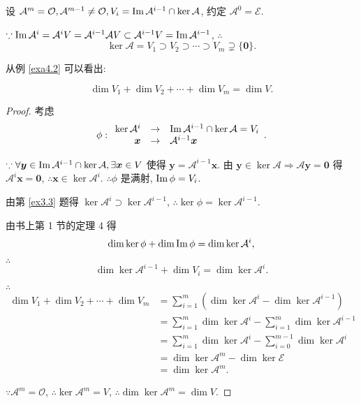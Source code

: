 \documentclass{ctexart}
\begin{document}
设 $\mathcal{A}^m=\mathcal{O},\mathcal{A}^{m-1}\neq\mathcal{O},V_i=\operatorname{Im} \mathcal{A}^{i-1}\cap\ker\mathcal{A}$, 约定 $\mathcal{A}^0=\mathcal{E}$.

$\because\operatorname{Im} \mathcal{A}^i=\mathcal{A}^iV=\mathcal{A}^{i-1}\mathcal{A}V\subset\mathcal{A}^{i-1}V=\operatorname{Im} \mathcal{A}^{i-1}$, $\therefore$
\[\ker\mathcal{A}=V_1\supset V_2\supset\cdots\supset V_m\supsetneq\{\boldsymbol{0}\}.\]

从例 \ref{exa4.2} 可以看出:
\begin{lemma}\label{l4.1}
    \[\dim V_1+\dim V_2+\cdots+\dim V_m=\dim V.\]
\end{lemma}
\begin{proof}
    考虑
    \[\phi:\begin{array}{rcl}
        \ker\mathcal{A}^i & \to & \operatorname{Im} \mathcal{A}^{i-1}\cap\ker\mathcal{A}=V_i \\
        \boldsymbol{x} & \to & \mathcal{A}^{i-1}\boldsymbol{x} \\
    \end{array}.\]

    $\because\forall\boldsymbol{y}\in\operatorname{Im} \mathcal{A}^{i-1}\cap\ker\mathcal{A},\exists\boldsymbol{x}\in V$ 使得 $\boldsymbol{y}=\mathcal{A}^{i-1}\boldsymbol{x}$. 由 $\boldsymbol{y}\in\ker\mathcal{A}\Rightarrow\mathcal{A}\boldsymbol{y}=\boldsymbol{0}$ 得 $\mathcal{A}^i\boldsymbol{x}=\boldsymbol{0}$, $\therefore\boldsymbol{x}\in\ker\mathcal{A}^i$. $\therefore\phi$ 是满射, $\operatorname{Im} \phi=V_i$.

    由第 \ref{ex3.3} 题得 $\ker\mathcal{A}^i\supset\ker\mathcal{A}^{i-1}$, $\therefore\ker\phi=\ker\mathcal{A}^{i-1}$.

    由书上第 1 节的定理 4 得
    \[\dim\ker\phi+\dim\operatorname{Im} \phi=\dim\ker\mathcal{A}^i,\]

    $\therefore$
    \begin{equation}\label{eq4.6}
        \dim\ker\mathcal{A}^{i-1}+\dim V_i=\dim\ker\mathcal{A}^i.
    \end{equation}

    $\therefore$
    \begin{align*}
        \dim V_1+\dim V_2+\cdots+\dim V_m & =\sum\limits_{i=1}^m\left(\dim\ker\mathcal{A}^i-\dim\ker\mathcal{A}^{i-1}\right) \\
        & =\sum\limits_{i=1}^m\dim\ker\mathcal{A}^i-\sum\limits_{i=1}^m\dim\ker\mathcal{A}^{i-1} \\
        & =\sum\limits_{i=1}^m\dim\ker\mathcal{A}^i-\sum\limits_{i=0}^{m-1}\dim\ker\mathcal{A}^i \\
        & =\dim\ker\mathcal{A}^m-\dim\ker\mathcal{E} \\
        & =\dim\ker\mathcal{A}^m.
    \end{align*}

    $\because\mathcal{A}^m=\mathcal{O}$, $\therefore\ker\mathcal{A}^m=V$, $\therefore\dim\ker\mathcal{A}^m=\dim V$.
\end{proof}
\end{document}
